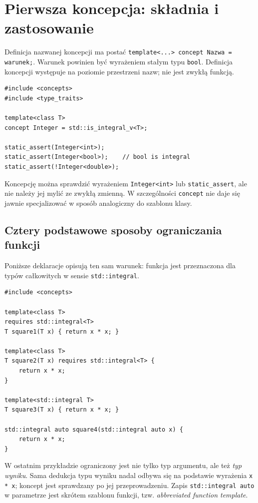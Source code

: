 \section{Pierwsza koncepcja: składnia i zastosowanie}
\label{sec:concepts-pierwsza}

Definicja nazwanej koncepcji ma postać
\texttt{template<...> concept Nazwa = warunek;}. Warunek powinien
być wyrażeniem stałym typu \texttt{bool}. Definicja koncepcji
występuje na poziomie przestrzeni nazw; nie jest zwykłą funkcją.

\begin{lstlisting}
#include <concepts>
#include <type_traits>

template<class T>
concept Integer = std::is_integral_v<T>;

static_assert(Integer<int>);
static_assert(Integer<bool>);    // bool is integral
static_assert(!Integer<double>);
\end{lstlisting}

Koncepcję można sprawdzić wyrażeniem \texttt{Integer<int>} lub
\texttt{static\_assert}, ale nie należy jej mylić ze zwykłą
zmienną. W szczególności \texttt{concept} nie daje się jawnie
specjalizować w sposób analogiczny do szablonu klasy.

\subsection{Cztery podstawowe sposoby ograniczania funkcji}

Poniższe deklaracje opisują ten sam warunek: funkcja jest przeznaczona
dla typów całkowitych w sensie \texttt{std::integral}.

\begin{lstlisting}
#include <concepts>

template<class T>
requires std::integral<T>
T square1(T x) { return x * x; }

template<class T>
T square2(T x) requires std::integral<T> {
    return x * x;
}

template<std::integral T>
T square3(T x) { return x * x; }

std::integral auto square4(std::integral auto x) {
    return x * x;
}
\end{lstlisting}

W ostatnim przykładzie ograniczony jest nie tylko typ argumentu,
ale też \emph{typ wyniku}. Sama dedukcja typu wyniku nadal odbywa
się na podstawie wyrażenia \texttt{x * x}; koncept jest sprawdzany
po jej przeprowadzeniu. Zapis \texttt{std::integral auto} w parametrze
jest skrótem szablonu funkcji, tzw. \emph{abbreviated function template}.

